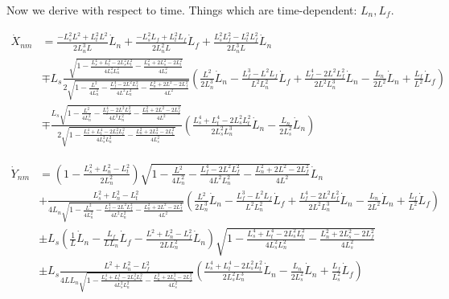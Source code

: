 \documentclass[11pt, landscape]{article}
\begin{document}
Now we derive with respect to time. Things which are time-dependent: $L_n, L_f$.

\begin{align}
  \dot{X}_{nm} &= \frac{-L_s^2L^2 + L_t^2L^2}{2L_n^3L}\dot{L}_n + \frac{-L_s^2L_{f} + L_t^2L_{f}}{2L_n^2L}\dot{L}_f + \frac{L_s^2L_{f}^2 - L_t^2L_{f}^2}{2L_n^3L}\dot{L}_n\\
  &\mp L_s\frac{\sqrt{1 - \frac{L_s^4 + L_t^4 - 2L_s^2L_t^2}{4L_{s}^2L_{n}^2} - \frac{L_n^2 + 2L_s^2 - 2L_t^2}{4L_s^2}}}{2\sqrt{1 - \frac{L^2}{4L_n^2} - \frac{L_f^4 - 2L^2L_f^2}{4L^2L_n^2} - \frac{L_n^2 + 2L^2 - 2L_f^2}{4L^2}}}\left(\frac{L^2}{2L_n^3}\dot{L}_n - \frac{L_f^3 - L^2L_f}{L^2L_n^2}\dot{L}_f + \frac{L_f^4 - 2L^2L_f^2}{2L^2L_n^3}\dot{L}_n - \frac{L_n}{2L^2}\dot{L}_n + \frac{L_f}{L^2}\dot{L}_f\right)\\
  &\mp \frac{L_s\sqrt{1 - \frac{L^2}{4L_n^2} - \frac{L_f^4 - 2L^2L_f^2}{4L^2L_n^2} - \frac{L_n^2 + 2L^2 - 2L_f^2}{4L^2}}}{2\sqrt{1 - \frac{L_s^4 + L_t^4 - 2L_s^2L_t^2}{4L_{s}^2L_{n}^2} - \frac{L_n^2 + 2L_s^2 - 2L_t^2}{4L_s^2}}}
  \left(\frac{L_s^4 + L_t^4 - 2L_s^2L_t^2}{2L_{s}^2L_{n}^3}\dot{L}_n - \frac{L_n}{2L_s^2}\dot{L}_n\right)
\end{align}

\begin{align}
  \dot{Y}_{nm} &= \left(1 - \frac{L_{s}^2+L_{n}^2-L_{t}^2}{2L_n^2}\right)\sqrt{1 - \frac{L^2}{4L_{n}^2} - \frac{L_f^4 - 2L^2L_f^2}{4L^2L^2_{n}} - \frac{L_n^2 + 2L^2 - 2L_f^2}{4L^2}}\dot{L}_n\\
  &+ \frac{L_{s}^2+L_{n}^2-L_{t}^2}{4L_{n}\sqrt{1 - \frac{L^2}{4L_{n}^2} - \frac{L_f^4 - 2L^2L_f^2}{4L^2L^2_{n}} - \frac{L_n^2 + 2L^2 - 2L_f^2}{4L^2}}}\left(\frac{L^2}{2L_n^3}\dot{L}_n - \frac{L_f^3 - L^2L_f}{L^2L^2_{n}}\dot{L}_f + \frac{L_f^4 - 2L^2L_f^2}{2L^2L^3_n}\dot{L}_n - \frac{L_n}{2L^2}\dot{L}_n + \frac{L_f}{L^2}\dot{L}_f\right)\\
  &\pm L_s\left(\frac{1}{L}\dot{L}_n - \frac{L_f}{LL_{n}}\dot{L}_f - \frac{L^2+L_{n}^2-L_{f}^2}{2LL_n^2}\dot{L}_n\right)\sqrt{1 - \frac{L_s^4 + L_t^4 - 2L_s^2L_t^2}{4L_s^2L_n^2} - \frac{L_n^2 + 2L_s^2 - 2L_f^2}{4L_s^2}}\\
  &\pm L_s\frac{L^2+L_{n}^2-L_{f}^2}{4LL_{n}\sqrt{1 - \frac{L_s^4 + L_t^4 - 2L_s^2L_t^2}{4L_s^2L_n^2} - \frac{L_n^2 + 2L_s^2 - 2L_f^2}{4L_s^2}}}\left(\frac{L_s^4 + L_t^4 - 2L_s^2L_t^2}{2L_s^2L_n^3}\dot{L}_n - \frac{L_n}{2L_s^2}\dot{L}_n + \frac{L_f}{L_s^2}\dot{L}_f\right)
\end{align}
\end{document}
